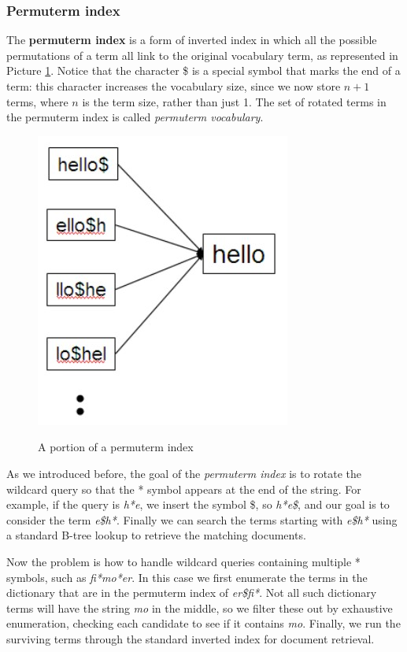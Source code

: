 \subsubsection{Permuterm index}
The \textbf{permuterm index} is a form of inverted index in which all the possible permutations of a term all link to the original vocabulary term, as represented in Picture \ref{permuterm_index}. Notice that the character \$ is a special symbol that marks the end of a term: this character increases the vocabulary size, since we now store $n+1$ terms, where $n$ is the term size, rather than just 1. The set of rotated terms in the permuterm index is called \textit{permuterm vocabulary}.

\begin{figure}[h!]
		\centering
		\includegraphics[scale = 1.6]{img/permuterm index.jpg}
		\label{permuterm_index}
        \caption{A portion of a permuterm index}
\end{figure}

As we introduced before, the goal of the \textit{permuterm index} is to rotate the wildcard query so that the * symbol appears at the end of the string. For example, if the query is \textit{h*e}, we insert the symbol \$, so \textit{h*e\$}, and our goal is to consider the term \textit{e\$h*}. Finally we can search the terms starting with \textit{e\$h*} using a standard B-tree lookup to retrieve the matching documents.

Now the problem is how to handle wildcard queries containing multiple * symbols, such as \textit{fi*mo*er}.  In this case we first enumerate the terms in the dictionary that are in the permuterm index of \textit{er\$fi*}. Not all such dictionary terms will have the string \textit{mo} in the middle, so we filter these out by exhaustive enumeration, checking each candidate to see if it contains \textit{mo}. Finally, we run the surviving terms through the standard inverted index for document retrieval.

